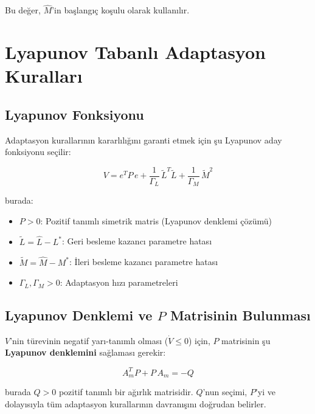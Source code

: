 \documentclass[12pt,a4paper]{article}
\begin{document}
Bu değer, $\hat{M}$'in başlangıç koşulu olarak kullanılır.

\section{Lyapunov Tabanlı Adaptasyon Kuralları}
\label{sec:adaptation}

\subsection{Lyapunov Fonksiyonu}

Adaptasyon kurallarının kararlılığını garanti etmek için şu Lyapunov aday fonksiyonu seçilir:

\begin{equation}
    V = e^T P\,e + \frac{1}{\Gamma_L}\,\tilde{L}^T\tilde{L} + \frac{1}{\Gamma_M}\,\tilde{M}^2
    \label{eq:lyapunov}
\end{equation}

burada:
\begin{itemize}
    \item $P > 0$: Pozitif tanımlı simetrik matris (Lyapunov denklemi çözümü)
    \item $\tilde{L} = \hat{L} - L^*$: Geri besleme kazancı parametre hatası
    \item $\tilde{M} = \hat{M} - M^*$: İleri besleme kazancı parametre hatası
    \item $\Gamma_L, \Gamma_M > 0$: Adaptasyon hızı parametreleri
\end{itemize}

\subsection{Lyapunov Denklemi ve $P$ Matrisinin Bulunması}
\label{subsec:lyapunov_eq}

$V$'nin türevinin negatif yarı-tanımlı olması ($\dot{V} \leq 0$) için, $P$ matrisinin şu \textbf{Lyapunov denklemini} sağlaması gerekir:

\begin{equation}
    \boxed{A_m^T P + P\,A_m = -Q}
    \label{eq:lyapunov_eq}
\end{equation}

burada $Q > 0$ pozitif tanımlı bir ağırlık matrisidir. $Q$'nun seçimi, $P$'yi ve dolayısıyla tüm adaptasyon kurallarının davranışını doğrudan belirler.
\end{document}
